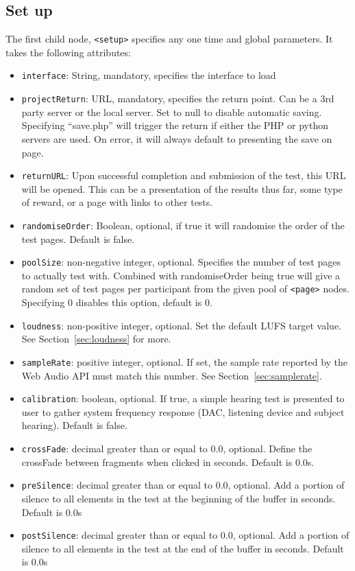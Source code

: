 \documentclass[11pt, oneside]{article}   	%
\begin{document}
    \subsection{Set up}
        The first child node, \texttt{<setup>} specifies any one time and global parameters. It takes the following attributes:
        \begin{itemize}
            \item \texttt{interface}: String, mandatory, specifies the interface to load
            \item \texttt{projectReturn}: URL, mandatory, specifies the return point. Can be a 3rd party server or the local server. Set to null to disable automatic saving. Specifying ``save.php'' will trigger the return if either the PHP or python servers are used. On error, it will always default to presenting the save on page.
            \item \texttt{returnURL}: Upon successful completion and submission of the test, this URL will be opened. This can be a presentation of the results thus far, some type of reward, or a page with links to other tests. 
            \item \texttt{randomiseOrder}: Boolean, optional, if true it will randomise the order of the test pages. Default is false.
            \item \texttt{poolSize}: non-negative integer, optional. Specifies the number of test pages to actually test with. Combined with randomiseOrder being true will give a random set of test pages per participant from the given pool of \texttt{<page>} nodes. Specifying 0 disables this option, default is 0.
            \item \texttt{loudness}: non-positive integer, optional. Set the default LUFS target value. See Section~\ref{sec:loudness} for more.
            \item \texttt{sampleRate}: positive integer, optional. If set, the sample rate reported by the Web Audio API must match this number. See Section~\ref{sec:samplerate}.
            \item \texttt{calibration}: boolean, optional. If true, a simple hearing test is presented to user to gather system frequency response (DAC, listening device and subject hearing). Default is false.
            \item \texttt{crossFade}: decimal greater than or equal to 0.0, optional. Define the crossFade between fragments when clicked in seconds. Default is 0.0s.
            \item \texttt{preSilence}: decimal greater than or equal to 0.0, optional. Add a portion of silence to all elements in the test at the beginning of the buffer in seconds. Default is 0.0s
            \item \texttt{postSilence}: decimal greater than or equal to 0.0, optional. Add a portion of silence to all elements in the test at the end of the buffer in seconds. Default is 0.0s
        \end{itemize}
        
\end{document}
